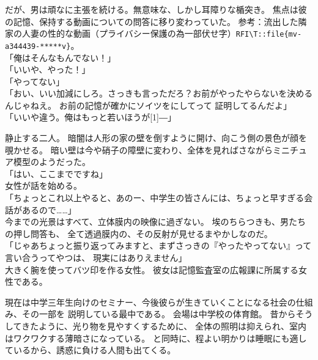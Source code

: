 \documentclass[../NenokuniMain]{subfiles}
\begin{document}
だが、男は頑なに主張を続ける。無意味な、しかし耳障りな楯突き。
焦点は彼の記憶、保持する動画についての問答に移り変わっていた。
参考：流出した隣家の人妻の性的な動画（プライバシー保護の為一部伏せ字）{\tt RFI\textbackslash T::file\{mv-a344439-*****v\}}。\\
「俺はそんなもんでない！」\\
「いいや、やった！」\\
「やってない」\\
「おい、いい加減にしろ。さっきも言っただろ？お前がやったやらないを決めるんじゃねえ。
お前の記憶が確かにソイツをにしてって
証明してるんだよ」\\
「いいや違う。俺はもっと若いほうが\scalebox{2}[1]{―}」

静止する二人。
暗闇は人形の家の壁を倒すように開け、向こう側の景色が顔を覗かせる。
暗い壁は今や硝子の障壁に変わり、全体を見ればさながらミニチュア模型のようだった。\\
「はい、ここまでですね」\\
女性が話を始める。\\
「ちょっとこれ以上やると、あのー、中学生の皆さんには、ちょっと早すぎる会話があるので……」\\
今までの光景はすべて、立体膜内の映像に過ぎない。
埃のちらつきも、男たちの押し問答も、
全て透過膜内の、その反射が見せるまやかしなのだ。\\
「じゃあちょっと振り返ってみますと、まずさっきの『やったやってない』って言い合うってやつは、
現実にはありえません」\\
大きく腕を使ってバツ印を作る女性。
彼女は記憶監査室の広報課に所属する女性である。

現在は中学三年生向けのセミナー、今後彼らが生きていくことになる社会の仕組み、その一部を
説明している最中である。
会場は中学校の体育館。
昔からそうしてきたように、光り物を見やすくするために、
全体の照明は抑えられ、室内はワクワクする薄暗さになっている。
と同時に、程よい明かりは睡眠にも適しているから、誘惑に負ける人間も出てくる。
\end{document}
